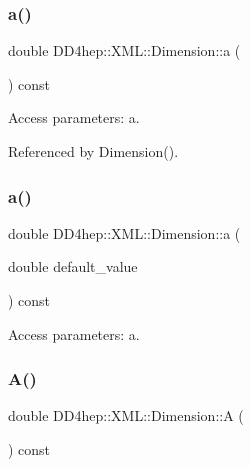 \subsubsection{\texorpdfstring{a()}{a()}\hspace{0.1cm}{\footnotesize\ttfamily [1/2]}}
{\footnotesize\ttfamily double D\+D4hep\+::\+X\+M\+L\+::\+Dimension\+::a (\begin{DoxyParamCaption}{ }\end{DoxyParamCaption}) const}



Access parameters\+: a. 



Referenced by Dimension().

\hypertarget{struct_d_d4hep_1_1_x_m_l_1_1_dimension_a17543094c676744b460cde971e8bd921}{}\label{struct_d_d4hep_1_1_x_m_l_1_1_dimension_a17543094c676744b460cde971e8bd921} 
\subsubsection{\texorpdfstring{a()}{a()}\hspace{0.1cm}{\footnotesize\ttfamily [2/2]}}
{\footnotesize\ttfamily double D\+D4hep\+::\+X\+M\+L\+::\+Dimension\+::a (\begin{DoxyParamCaption}\item[{double}]{default\+\_\+value }\end{DoxyParamCaption}) const}



Access parameters\+: a. 

\hypertarget{struct_d_d4hep_1_1_x_m_l_1_1_dimension_acfbf84e7e830bd3a8085f8c53d39fc1c}{}\label{struct_d_d4hep_1_1_x_m_l_1_1_dimension_acfbf84e7e830bd3a8085f8c53d39fc1c} 
\subsubsection{\texorpdfstring{A()}{A()}\hspace{0.1cm}{\footnotesize\ttfamily [1/2]}}
{\footnotesize\ttfamily double D\+D4hep\+::\+X\+M\+L\+::\+Dimension\+::A (\begin{DoxyParamCaption}{ }\end{DoxyParamCaption}) const}



